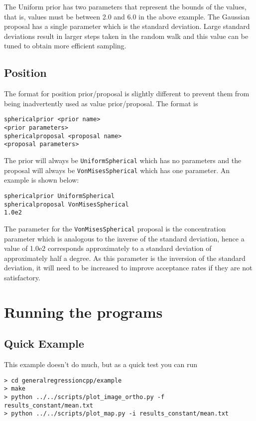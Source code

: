 \documentclass{article}
\begin{document}
The Uniform prior has two parameters that represent the bounds of
the values, that is, values must be between 2.0 and 6.0 in the
above example. The Gaussian proposal has a single parameter which
is the standard deviation. Large standard deviations result in
larger steps taken in the random walk and this value can be
tuned to obtain more efficient sampling.

\subsection{Position}

The format for position prior/proposal is slightly different to prevent
them from being inadvertently used as value prior/proposal. The format
is 

\begin{verbatim}
sphericalprior <prior name>
<prior parameters>
sphericalproposal <proposal name>
<proposal parameters>
\end{verbatim}

The prior will always be {\tt UniformSpherical} which has no parameters
and the proposal will always be {\tt VonMisesSpherical} which has one
parameter. An example is shown below:

\begin{verbatim}
sphericalprior UniformSpherical
sphericalproposal VonMisesSpherical
1.0e2
\end{verbatim}

The parameter for the {\tt VonMisesSpherical} proposal is the
concentration parameter which is analogous to the inverse of the
standard deviation, hence a value of 1.0e2 corresponds approximately
to a standard deviation of approximately half a degree. As this
parameter is the inversion of the standard deviation, it will need
to be increased to improve acceptance rates if they are not satisfactory.

\section{Running the programs}

\subsection{Quick Example}

This example doesn't do much, but as a quick test you can run

\begin{verbatim}
> cd generalregressioncpp/example
> make
> python ../../scripts/plot_image_ortho.py -f results_constant/mean.txt
> python ../../scripts/plot_map.py -i results_constant/mean.txt
\end{verbatim}
\end{document}
